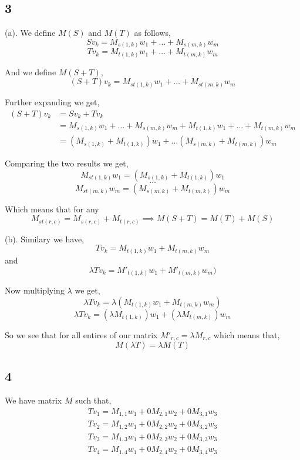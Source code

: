 \documentclass[a4paper]{report}
\begin{document}
\subsection*{3}
(a). We define $M(S)$ and $M(T)$ as follows, 
$$ Sv_k = M_{s(1,k)}w_1+ \dots + M_{s(m,k)}w_m $$ 
$$ Tv_k = M_{t(1,k)}w_1+ \dots + M_{t(m,k)}w_m $$ 

And we define $M(S+T)$, 
$$ (S+T)v_k = M_{st(1,k)}w_1 + \dots + M_{st(m,k)} w_m $$ 

Further expanding we get, 
\begin{align*}
    (S+T)v_k &= Sv_k + Tv_k\\
             &=  M_{s(1,k)}w_1+ \dots + M_{s(m,k)}w_m + M_{t(1,k)}w_1+ \dots + M_{t(m,k)}w_m \\
             &= (M_{s(1,k)} + M_{t(1,k)})w_1 + \dots (M_{s(m,k)} + M_{t(m,k)})w_m
\end{align*}

Comparing the two results we get, 
$$ M_{st(1,k)}w_1  = (M_{s(1,k)} + M_{t(1,k)})w_1$$ 
$$ \dots $$ 
$$ M_{st(m,k)}w_m  = (M_{s(m,k)} + M_{t(m,k)})w_m$$ 

Which means that for any 
$$ M_{st(r,c)} = M_{s(r,c)}  + M_{t(r,c)} \implies M(S + T) = M(T) + M(S)$$ 

(b). Similary we have, 
$$ Tv_k = M_{t(1,k)}w_1 +  M_{t(m,k)}w_m  $$  and 
$$ \lambda Tv_k = M'_{t(1,k)}w_1 +  M'_{t(m,k)}w_m ) $$ 

Now multiplying $\lambda$ we get,
$$ \lambda Tv_k = \lambda(M_{t(1,k)}w_1 +  M_{t(m,k)}w_m ) $$ 
$$ \lambda Tv_k = (\lambda M_{t(1,k)})w_1 +  (\lambda M_{t(m,k)})w_m  $$ 

So we see that for all entires of our matrix $M'_{r,c} = \lambda M_{r,c}$ which means that,  
$$ M(\lambda T) = \lambda M(T) $$ 



\subsection*{4}

We have matrix $M$ such that, 
\begin{align*}
    Tv_1 = M_{1,1}w_1 + 0 M_{2,1}w_2 + 0 M_{3,1}w_3\\
    Tv_2 = M_{1,2}w_1 + 0 M_{2,2}w_2 + 0 M_{3,2}w_3\\
    Tv_3 = M_{1,3}w_1 + 0 M_{2,3}w_2 + 0 M_{3,3}w_3\\
    Tv_4 = M_{1,4}w_1 + 0 M_{2,4}w_2 + 0 M_{3,4}w_3\\
\end{align*}
\end{document}
